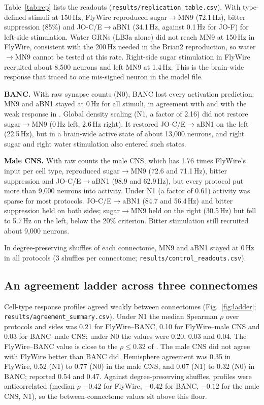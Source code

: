 Table~\ref{tab:rep} lists the readouts (\texttt{results/replication\_table.csv}). With
type-defined stimuli at 150\,Hz, FlyWire reproduced sugar$\to$MN9 (72.1\,Hz), bitter
suppression (85\%) and JO-C/E$\to$aBN1 (34.1\,Hz, against 0.1\,Hz for JO-F) for left-side
stimulation. Water GRNs (LB3a alone) did not reach MN9 at 150\,Hz in FlyWire, consistent with
the 200\,Hz needed in the Brian2 reproduction, so water$\to$MN9 cannot be tested at this rate.
Right-side sugar stimulation in FlyWire recruited about 8{,}500 neurons and left MN9 at
1.4\,Hz. This is the brain-wide response that \citep{santos2026} traced to one mis-signed
neuron in the model file.

\textbf{BANC.} With raw synapse counts (N0), BANC lost every activation prediction: MN9 and
aBN1 stayed at 0\,Hz for all stimuli, in agreement with \citep{santos2026} and with the weak
response in \citep{brainlab2026}. Global density scaling (N1, a factor of 2.16) did not
restore sugar$\to$MN9 (0\,Hz left, 2.6\,Hz right). It restored JO-C/E$\to$aBN1 on the left
(22.5\,Hz), but in a brain-wide active state of about 13{,}000 neurons, and right sugar and
right water stimulation also entered such states.

\textbf{Male CNS.} With raw counts the male CNS, which has 1.76 times FlyWire's input per
cell type, reproduced sugar$\to$MN9 (72.6 and 71.1\,Hz), bitter suppression and
JO-C/E$\to$aBN1 (98.9 and 62.9\,Hz), but every protocol put more than 9{,}000 neurons into
activity. Under N1 (a factor of 0.61) activity was sparse for most protocols.
JO-C/E$\to$aBN1 (84.7 and 56.4\,Hz) and bitter suppression held on both sides;
sugar$\to$MN9 held on the right (30.5\,Hz) but fell to 5.7\,Hz on the left, below the 20\%
criterion. Bitter stimulation still recruited about 9{,}000 neurons.

In degree-preserving shuffles of each connectome, MN9 and aBN1 stayed at 0\,Hz in all
protocols (3 shuffles per connectome; \texttt{results/control\_readouts.csv}).

\subsection*{An agreement ladder across three connectomes}
Cell-type response profiles agreed weakly between connectomes
(Fig.~\ref{fig:ladder}; \texttt{results/agreement\_summary.csv}). Under N1 the median
Spearman $\rho$ over protocols and sides was 0.21 for FlyWire--BANC, 0.10 for FlyWire--male
CNS and 0.03 for BANC--male CNS; under N0 the values were 0.20, 0.03 and 0.04. The
FlyWire--BANC value is close to the $\rho\le0.32$ of \citep{santos2026}. The male CNS did
not agree with FlyWire better than BANC did. Hemisphere agreement was 0.35 in FlyWire, 0.52
(N1) to 0.77 (N0) in the male CNS, and 0.07 (N1) to 0.32 (N0) in BANC; \citep{santos2026}
reported 0.54 and 0.47. Against degree-preserving shuffles, profiles were anticorrelated
(median $\rho$ $-0.42$ for FlyWire, $-0.42$ for BANC, $-0.12$ for the male CNS, N1), so the
between-connectome values sit above this floor.


